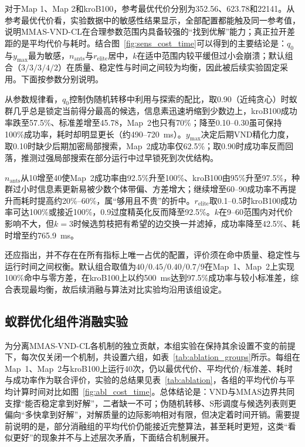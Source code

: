 \documentclass[lettersize,journal]{IEEEtran}
\begin{document}
对于Map 1、Map 2和kroB100，参考最优代价分别为352.56、623.78和22141。从参考最优代价看，实验数据中的敏感性结果显示，全部配置都能触及同一参考值，说明MMAS-VND-CL在合理参数范围内具备较强的“找到优解”能力；真正拉开差距的是平均代价与耗时。结合图~\textcolor{blue}{\ref{fig:sens_cost_time}}可以得到的主要结论是：$q_0$与$y_{\max}$最为敏感，$n_{\mathrm{ants}}$与$r_{\mathrm{elite}}$居中，$k$在适中范围内较平缓但过小会崩溃；默认组合（$3/3/3/4/2$）在质量、稳定性与时间之间较为均衡，因此被后续实验固定采用。下面按参数分别说明。

从参数规律看，$q_0$控制伪随机转移中利用与探索的配比，取0.90（近纯贪心）时蚁群几乎总是锁定当前得分最高的候选，信息素迅速坍缩到少数边上，kroB100成功率跌至57.5\%、标准差增至45.78，Map~2也只有70\%；降至0.10--0.30虽可保持100\%成功率，耗时却明显更长（约490--720~ms）。$y_{\max}$决定后期VND精化力度，取0.10时缺少后期加密局部搜索，Map~2成功率仅62.5\%；取0.90时成功率反而回落，推测过强局部搜索在部分运行中过早锁死到次优结构。

$n_{\mathrm{ants}}$从10增至40使Map~2成功率由92.5\%升至100\%、kroB100由95\%升至97.5\%，种群过小时信息素更新易被少数个体带偏、方差增大；继续增至60--90成功率不再提升而耗时提高约20\%--60\%，属“够用且不贵”的折中。$r_{\mathrm{elite}}$取0.1--0.5时kroB100成功率可达100\%或接近100\%，0.9过度精英化反而降至92.5\%。$k$在9--60范围内对代价影响不大，但$k=3$时候选剪枝把有希望的边交换一并滤掉，成功率降至42.5\%、耗时增至约765.9~ms。

还应指出，并不存在在所有指标上唯一占优的配置，评价须在命中质量、稳定性与运行时间之间权衡。默认组合取值为$40/0.45/0.40/0.7/9$在Map~1、Map~2上实现100\%命中与零方差，在kroB100上以约500~ms达到97.5\%成功率与较小标准差，综合表现最均衡，故后续消融与算法对比实验均沿用该组设定。

\subsection{蚁群优化组件消融实验}

\label{subsec:exp_ablation}

为分离MMAS-VND-CL各机制的独立贡献，本组实验在保持其余设置不变的前提下，每次仅关闭一个机制，共设置六组，如表~\textcolor{blue}{\ref{tab:ablation_groups}}所示。每组在Map~1、Map~2与kroB100上运行40次，仍以最优代价、平均代价/标准差、耗时与成功率作为联合评价，实验的总结果见表~\textcolor{blue}{\ref{tab:ablation}}，各组的平均代价与平均计算时间对比如图~\textcolor{blue}{\ref{fig:abl_cost_time}}。总体结论是：VND与MMAS边界共同支撑“能否稳定拿到好解”，二者缺一不可；伪随机转移、S形调度与候选列表则更偏向“多快拿到好解”，对解质量的边际影响相对有限，但决定着时间开销。需要提前说明的是，部分消融组的平均代价仍能接近完整算法，甚至耗时更短，这类“看似更好”的现象并不与上述层次矛盾，下面结合机制展开。
\end{document}

